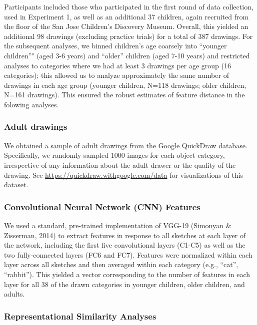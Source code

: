 \documentclass[10pt, letterpaper]{article}
\begin{document}
Participants included those who participated in the first round of data
collection, used in Experiment 1, as well as an additional 37 children,
again recruited from the floor of the San Jose Children's Discovery
Museum. Overall, this yielded an additional 98 drawings (excluding
practice trials) for a total of 387 drawings. For the subsequent
analyses, we binned children's age coarsely into ``younger children''"
(aged 3-6 years) and ``older'' children (aged 7-10 years) and restricted
analyses to categories where we had at least 3 drawings per age group
(16 categories); this allowed us to analyze approximately the same
number of drawings in each age group (younger children, N=118 drawings;
older children, N=161 drawings). This ensured the robust estimates of
feature distance in the folowing analyses.

\subsubsection{Adult drawings}\label{adult-drawings}

We obtained a sample of adult drawings from the Google QuickDraw
database. Specifically, we randomly sampled 1000 images for each object
category, irrespective of any information about the adult drawer or the
quality of the drawing. See \url{https://quickdraw.withgoogle.com/data}
for visualizations of this dataset.

\subsubsection{Convolutional Neural Network (CNN)
Features}\label{convolutional-neural-network-cnn-features}

We used a standard, pre-trained implementation of VGG-19 (Simonyan \&
Zisserman, 2014) to extract features in response to all sketches at each
layer of the network, including the first five convolutional layers
(C1-C5) as well as the two fully-connected layers (FC6 and FC7).
Features were normalized within each layer across all sketches and then
averaged within each category (e.g., ``cat'', ``rabbit''). This yielded
a vector corresponding to the number of features in each layer for all
38 of the drawn categories in younger children, older children, and
adults.

\subsubsection{Representational Similarity
Analyses}\label{representational-similarity-analyses}
\end{document}

